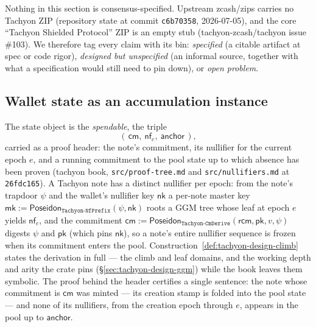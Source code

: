 \documentclass[11pt,a4paper]{article}
\theoremstyle{definition}
\newcommand{\nfsym}{\mathsf{nf}}
\newcommand{\cmsym}{\mathsf{cm}}
\newcommand{\nksym}{\ensuremath{\mathsf{nk}}}
\newcommand{\rcm}{\ensuremath{\mathsf{rcm}}}
\begin{document}
Nothing in this section is consensus-specified. Upstream zcash/zips carries
no Tachyon ZIP (repository state at commit \texttt{c6b70358}, 2026-07-05),
and the core ``Tachyon Shielded Protocol'' ZIP is an empty stub
(tachyon-zcash/tachyon issue \#103). We therefore tag every claim with its
bin: \emph{specified} (a citable artifact at spec or code rigor),
\emph{designed but unspecified} (an informal source, together with what a
specification would still need to pin down), or \emph{open problem}.

\subsection{Wallet state as an accumulation instance}\label{sec:tachyon-fold}

The state object is the \emph{spendable}, the triple
\[
(\,\cmsym,\ \nfsym_e,\ \mathsf{anchor}\,),
\]
carried as a proof header: the note's commitment, its nullifier for the
current epoch $e$, and a running commitment to the pool state up to which
absence has been proven (tachyon book, \texttt{src/proof-tree.md} and
\texttt{src/nullifiers.md} at \texttt{26fdc165}). A Tachyon note has a
distinct nullifier per epoch: from the note's trapdoor $\psi$ and the
wallet's nullifier key $\nksym$ a per-note master key
$\mathsf{mk} := \mathsf{Poseidon}_{\texttt{Tachyon-NfPrefix}}(\psi, \nksym)$
roots a GGM tree whose leaf at epoch $e$ yields $\nfsym_e$, and the
commitment
$\cmsym := \mathsf{Poseidon}_{\texttt{Tachyon-CmDerive}}(\rcm, \mathsf{pk},
v, \psi)$ digests $\psi$ and $\mathsf{pk}$ (which pins $\nksym$), so a note's
entire nullifier sequence is frozen when its commitment enters the pool.
Construction~\ref{def:tachyon-design-climb} states the derivation in full
--- the climb and leaf domains, and the working depth and arity the crate
pins (\S\ref{sec:tachyon-design-ggm}) while the book leaves them symbolic.
The proof behind the header certifies a single sentence: the note whose
commitment is $\cmsym$ was minted --- its creation stamp is folded into the
pool state --- and none of its nullifiers, from the creation epoch through
$e$, appears in the pool up to $\mathsf{anchor}$.
\end{document}
